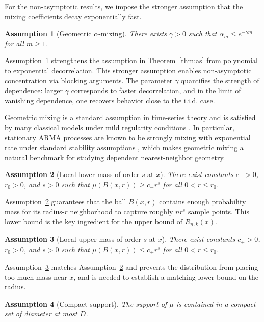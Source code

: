\documentclass[12pt]{article}
\newtheorem{assumption}{Assumption}
\theoremstyle{definition}
\begin{document}
For the non-asymptotic results, we impose the stronger assumption that the mixing coefficients decay exponentially fast.
\begin{assumption}[Geometric $\alpha$-mixing]\label{ass:geom}
There exists $\gamma>0$ such that $\alpha_m \le e^{-\gamma m}$ for all $m \ge 1$.
\end{assumption}
  
Assumption~\ref{ass:geom} strengthens the assumption in Theorem~\ref{thm:as} from polynomial to exponential decorrelation. This stronger assumption enables non-asymptotic concentration via blocking arguments. The parameter $\gamma$ quantifies the strength of dependence: larger $\gamma$ corresponds to faster decorrelation, and in the limit of vanishing dependence, one recovers behavior close to the i.i.d. case.

Geometric mixing is a standard assumption in time-series theory and is satisfied by many classical models under mild regularity conditions \citep{doukhan2012mixing}. In particular, stationary ARMA processes are known to be strongly mixing with exponential rate under standard stability assumptions \citep{mokkadem1988mixing}, which makes geometric mixing a natural benchmark for studying dependent nearest-neighbor geometry. 
  
\begin{assumption}[Local lower mass of order $s$ at $x$]\label{ass:lower}
There exist constants $c_->0$, $r_0>0$, and $s>0$ such that $\mu(B(x,r)) \ge c_- r^s$ for all $0<r\le r_0$.
\end{assumption}
  
Assumption~\ref{ass:lower} guarantees that the ball $B(x,r)$ contains enough probability mass for its radius-$r$ neighborhood to capture roughly $nr^s$ sample points. This lower bound is the key ingredient for the upper bound of $R_{n,k}(x)$.
  

\begin{assumption}[Local upper mass of order $s$ at $x$]\label{ass:upper}
There exist constants $c_+>0$, $r_0>0$, and $s>0$ such that $\mu(B(x,r)) \le c_+ r^s$ for all $0<r\le r_0$.
\end{assumption}

Assumption~\ref{ass:upper} matches Assumption~\ref{ass:lower} and prevents the distribution from placing too much mass near $x$, and is needed to establish a matching lower bound on the radius.
  
\begin{assumption}[Compact support]\label{ass:compact}
The support of $\mu$ is contained in a compact set of diameter at most $D$.
\end{assumption}
\end{document}
